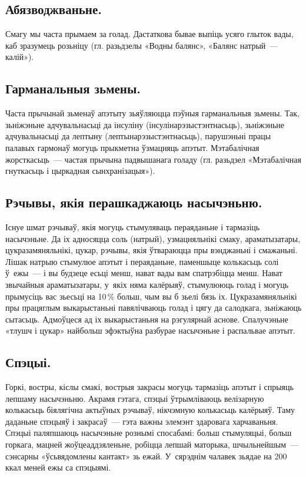 \subsection{Абязводжваньне.}
Смагу мы часта прымаем за голад. Дастаткова бывае выпіць усяго глыток вады, каб зразумець розьніцу (гл. разьдзелы «Водны балянс», «Балянс натрый~--- калій»).

\subsection{Гарманальныя зьмены.}
Часта прычынай зьменаў апэтыту зьяўляюцца пэўныя гарманальныя зьмены. Так, зьніжэньне адчувальнасьці да інсуліну (інсулінарэзыстэнтнасьць), зьніжэньне адчувальнасьці да лептыну (лептынарэзыстэнтнасьць), парушэньні працы палавых гармонаў могуць прыкметна ўзмацняць апэтыт. Мэтабалічная жорсткасьць~--- частая прычына падвышанага голаду (гл. разьдзел «Мэтабалічная гнуткасьць і цыркадная сынхранізацыя»).

\subsection{Рэчывы, якія перашкаджаюць насычэньню.}
Існуе шмат рэчываў, якія могуць стымуляваць пераяданьне і тармазіць насычэньне. Да іх адносяцца соль (натрый), узмацняльнікі смаку, араматызатары, цукразамяняльнікі, цукар, рэчывы, якія ўтвараюцца пры вэнджаньні і смажаньні. Лішак натрыю стымулюе апэтыт і пераяданьне, паменшыце колькасьць солі ў~ежы~--- і вы будзеце есьці менш, нават вады вам спатрэбіцца менш. Нават звычайныя араматызатары, у~якіх няма калёрыяў, стымулююць голад і могуць прымусіць вас зьесьці на 10\,\% больш, чым вы б зьелі бязь іх. Цукразамяняльнікі пры працяглым выкарыстаньні павялічваюць голад і цягу да салодкага, зьніжаюць сытасьць. Адмоўцеся ад іх выкарыстаньня на рэгулярнай аснове. Спалучэньне «тлушч і цукар» найбольш эфэктыўна разбурае насычэньне і распальвае апэтыт.

\subsection{Спэцыі.}
Горкі, востры, кіслы смакі, вострыя закрасы могуць тармазіць апэтыт і спрыяць лепшаму насычэньню. Акрамя гэтага, спэцыі ўтрымліваюць велізарную колькасьць біялягічна актыўных рэчываў, нікчэмную колькасьць калёрыяў. Таму даданьне спэцыяў і закрасаў~--- гэта важны элемэнт здаровага харчаваньня. Спэцыі паляпшаюць насычэньне рознымі спосабамі: больш стымуляцыі, больш горкага, мацней жоўцеаддзяленьне, робіцца лепшай маторыка, шчыльнейшым~--- сэнсарны «ўсьвядомлены кантакт» зь ежай. У~сярэднім чалавек зьядае на 200\,ккал меней ежы са спэцыямі.

